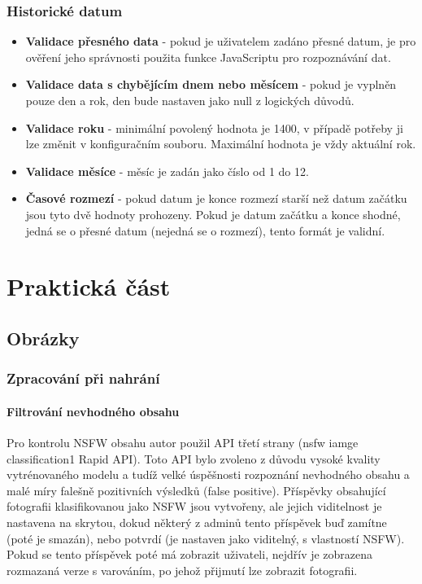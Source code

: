\documentclass[12pt, a4paper,
 twoside,        %
 openright
]{report}
\begin{document}
\subsection{Historické datum}
    \begin{itemize}
        \item \textbf{Validace přesného data} - pokud je uživatelem zadáno přesné datum, je pro ověření jeho správnosti použita funkce JavaScriptu pro rozpoznávání dat.
        \item \textbf{Validace data s chybějícím dnem nebo měsícem} - pokud je vyplněn pouze den a rok, den bude nastaven jako null z logických důvodů. 
        \item \textbf{Validace roku} - minimální povolený hodnota je 1400, v případě potřeby ji lze změnit v konfiguračním souboru. Maximální hodnota je vždy aktuální rok.        
        \item \textbf{Validace měsíce} - měsíc je zadán jako číslo od 1 do 12.
        \item \textbf{Časové rozmezí} - pokud datum je konce rozmezí starší než datum začátku jsou tyto dvě hodnoty prohozeny. Pokud je datum začátku a konce shodné, jedná se o přesné datum (nejedná se o rozmezí), tento formát je validní.
    \end{itemize}


\chapter{Praktická část}


\section{Obrázky}
\subsection{Zpracování při nahrání}
\subsubsection{Filtrování nevhodného obsahu}\label{section:nsfw_filter}
Pro kontrolu NSFW obsahu autor použil API třetí strany (nsfw iamge classification1 Rapid API). Toto API bylo zvoleno z důvodu vysoké kvality vytrénovaného modelu a tudíž velké úspěšnosti rozpoznání nevhodného obsahu a malé míry falešně pozitivních výsledků (false positive). Příspěvky obsahující fotografii klasifikovanou jako NSFW jsou vytvořeny, ale jejich viditelnost je nastavena na skrytou, dokud některý z adminů tento příspěvek buď zamítne (poté je smazán), nebo potvrdí (je nastaven jako viditelný, s vlastností NSFW). Pokud se tento příspěvek poté má zobrazit uživateli, nejdřív je zobrazena rozmazaná verze s varováním, po jehož přijmutí lze zobrazit fotografii.
\end{document}
